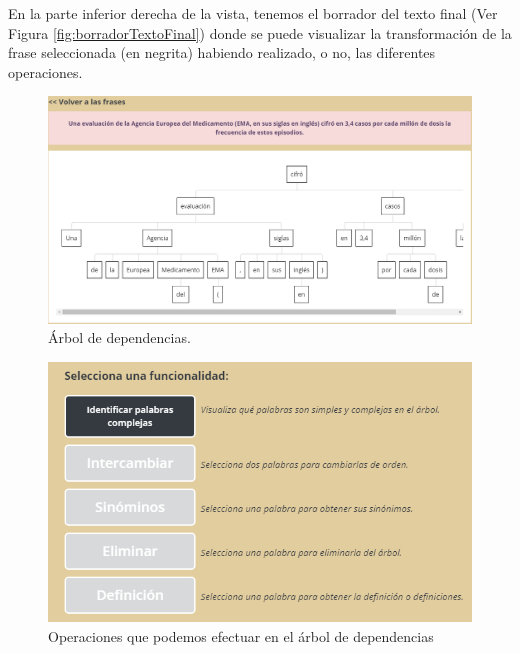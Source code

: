  En la parte inferior derecha de la vista, tenemos el borrador del texto final (Ver Figura \ref{fig:borradorTextoFinal}) donde se puede visualizar la transformación de la frase seleccionada (en negrita) habiendo realizado, o no, las diferentes operaciones. 
\begin{figure}[h!]
	\centering	
	\includegraphics[scale=0.7]{Imagenes/Figuras/arbol}	
	\caption{Árbol de dependencias.}
	\label{fig:arbolDependencias}
\end{figure}
\begin{figure}[h!]
	\centering
	\includegraphics[scale=1.0]{Imagenes/Figuras/botonesFuncionales}
	\caption{Operaciones que podemos efectuar en el árbol de dependencias}
	\label{fig:botonesFuncionales}
\end{figure}
